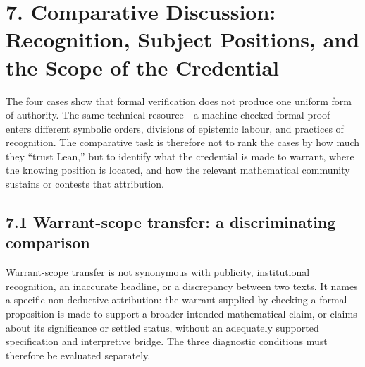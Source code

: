 \documentclass[sn-apa]{sn-jnl}
\begin{document}
\section{7. Comparative Discussion: Recognition, Subject Positions, and the Scope of the Credential}

The four cases show that formal verification does not produce one uniform form of authority. The same technical resource—a machine-checked formal proof—enters different symbolic orders, divisions of epistemic labour, and practices of recognition. The comparative task is therefore not to rank the cases by how much they “trust Lean,” but to identify what the credential is made to warrant, where the knowing position is located, and how the relevant mathematical community sustains or contests that attribution.

\subsection{7.1 Warrant-scope transfer: a discriminating comparison}

Warrant-scope transfer is not synonymous with publicity, institutional recognition, an inaccurate headline, or a discrepancy between two texts. It names a specific non-deductive attribution: the warrant supplied by checking a formal proposition is made to support a broader intended mathematical claim, or claims about its significance or settled status, without an adequately supported specification and interpretive bridge. The three diagnostic conditions must therefore be evaluated separately.
\end{document}
